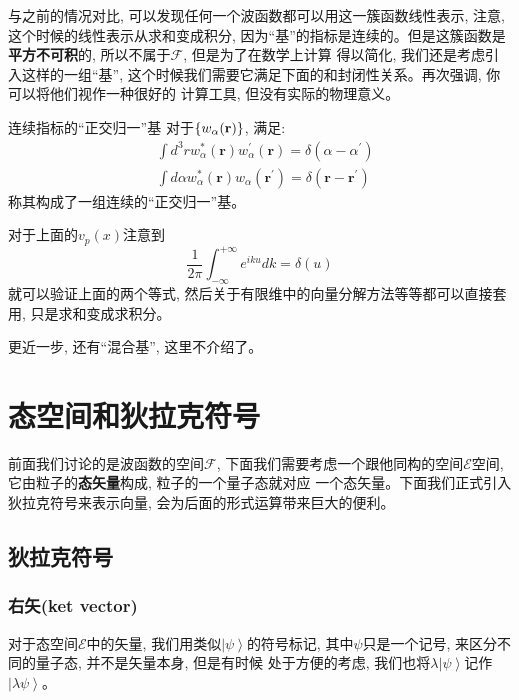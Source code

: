 与之前的情况对比, 可以发现任何一个波函数都可以用这一簇函数线性表示, 注意, 这个时候的线性表示从求和变成积分, 因为“基”的指标是连续的。但是这簇函数是\textbf{平方不可积}的, 所以不属于$\mathscr{F}$, 但是为了在数学上计算
得以简化, 我们还是考虑引入这样的一组“基”, 这个时候我们需要它满足下面的和封闭性关系。再次强调, 你可以将他们视作一种很好的
计算工具, 但没有实际的物理意义。
\begin{define}{连续指标的“正交归一”基}
    对于$\{w_\alpha(\bf{r})\}$, 满足:
    \begin{align}
            &\int d^3r w^*_\alpha(\bm{r}) w_\alpha^\prime(\bm{r})=\delta\left(\alpha-\alpha^\prime\right)\\
            &\int d\alpha w^*_\alpha(\bm{r}) w_\alpha(\bm{r^\prime})=\delta\left(\bm{r}-\bm{r^\prime}\right)
    \end{align}
    称其构成了一组连续的“正交归一”基。
\end{define}
对于上面的$v_p(x)$注意到\[\frac{1}{{2\pi }}\int_{ - \infty }^{ + \infty } {{e^{iku}}} dk = \delta (u)\]就可以验证上面的两个等式, 然后关于有限维中的向量分解方法等等都可以直接套用, 只是求和变成求积分。

更近一步, 还有“混合基”, 这里不介绍了。
\section{态空间和狄拉克符号}
前面我们讨论的是波函数的空间$\mathscr{F}$, 下面我们需要考虑一个跟他同构的空间$\mathscr{E}$空间, 它由粒子的\textbf{态矢量}构成, 粒子的一个量子态就对应
一个态矢量。下面我们正式引入狄拉克符号来表示向量, 会为后面的形式运算带来巨大的便利。
\subsection*{狄拉克符号}
\subsubsection*{右矢(ket vector)}
对于态空间$\mathscr{E}$中的矢量, 我们用类似$\left | \psi  \right \rangle $的符号标记, 其中$\psi$只是一个记号, 来区分不同的量子态, 并不是矢量本身, 但是有时候
处于方便的考虑, 我们也将$\lambda\left | \psi  \right \rangle $记作$\left | \lambda\psi  \right \rangle $。
